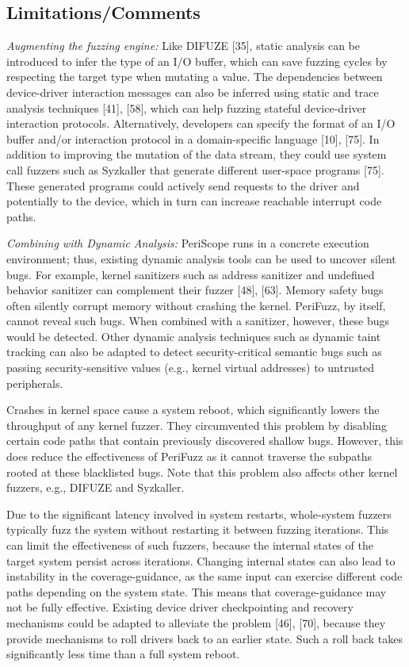 \subsection{Limitations/Comments}
\emph{Augmenting the fuzzing engine:} Like DIFUZE [35], static analysis can be introduced to infer the type of an I/O buffer, which can save fuzzing cycles by respecting the target type when mutating a value. The dependencies between device-driver interaction messages can also be inferred using static and trace analysis techniques [41], [58], which can help fuzzing stateful device-driver interaction protocols. Alternatively, developers can specify the format of an I/O buffer and/or interaction protocol in a domain-specific language [10], [75]. In addition to improving the mutation of the data stream, they could use system call fuzzers such as Syzkaller that generate different user-space programs [75].  These generated programs could actively send requests to the driver and potentially to the device, which in turn can increase reachable interrupt code paths.

\emph{Combining with Dynamic Analysis:}
PeriScope runs in a concrete execution environment; thus, existing dynamic analysis tools can be used to uncover silent bugs. For example, kernel sanitizers such as address sanitizer and undefined behavior sanitizer can complement their fuzzer [48], [63]. Memory safety bugs often silently corrupt memory without crashing the kernel. PeriFuzz, by itself, cannot reveal such bugs. When combined with a sanitizer, however, these bugs would be detected. Other dynamic analysis techniques such as dynamic taint tracking can also be adapted to detect security-critical semantic bugs such as passing security-sensitive values (e.g., kernel virtual addresses) to untrusted peripherals.

Crashes in kernel space cause a system reboot, which significantly lowers the throughput of any kernel fuzzer.  They circumvented this problem by disabling certain code paths that contain previously discovered shallow bugs. However, this does reduce the effectiveness of PeriFuzz as it cannot traverse the subpaths rooted at these blacklisted bugs. Note that this problem also affects other kernel fuzzers, e.g., DIFUZE and Syzkaller.

Due to the significant latency involved in system restarts, whole-system fuzzers typically fuzz the system without restarting it between fuzzing iterations.  This can limit the effectiveness of such fuzzers, because the internal states of the target system persist across iterations.  Changing internal states can also lead to instability in the coverage-guidance, as the same input can exercise different code paths depending on the system state. This means that coverage-guidance may not be fully effective.  Existing device driver checkpointing and recovery mechanisms could be adapted to alleviate the problem [46], [70], because they provide mechanisms to roll drivers back to an earlier state. Such a roll back takes significantly less time than a full system reboot.
\newpage


